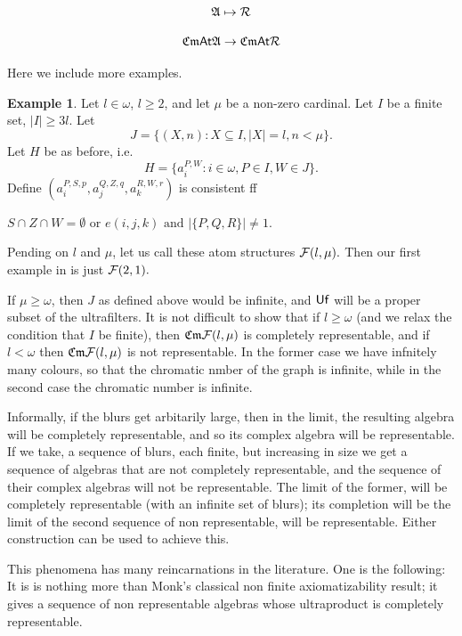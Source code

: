\documentclass[12pt]{article}
\theoremstyle{definition}
\newtheorem{example}[theorem]{Example}
\def\A{{\mathfrak{A}}}
\def\Uf{{\sf Uf}}
\def\Cm{{\mathfrak{Cm}}}
\def\A{{\mathfrak{A}}}
\def\A{{\mathfrak{A}}}
\def\At{{\sf At}}
\begin{document}
$$\A\mapsto {\cal R}$$

$$\Cm\At\A\to \Cm\At{\cal R}$$



Here we include more examples.

\begin{example}


Let $l\in \omega$, $l\geq 2$, and let $\mu$ be a non-zero cardinal. Let $I$ be a finite set,
$|I|\geq 3l.$ Let
$$J=\{(X,n): X\subseteq I, |X|=l,n<\mu\}.$$
Let $H$ be as before, i.e.
$$H=\{a_i^{P,W}: i\in \omega, P\in I, W\in J\}.$$
Define
$(a_i^{P,S,p}, a_j^{Q,Z,q}, a_k^{R,W,r})$ is consistent ff

$S\cap Z\cap W=\emptyset$ or
$ e(i,j,k) \text { and } |\{P,Q,R\}|\neq 1.$

Pending on $l$ and $\mu$, let us call these atom structures ${\cal F}(l,\mu).$
Then our first  example in is just
${\cal F}(2,1).$

If $\mu\geq \omega$, then $J$ as defined above would be infinite,
and $\Uf$ will be a proper subset of the ultrafilters.
It is not difficult to show that if $l\geq \omega$
(and we relax the condition that $I$ be finite), then
$\Cm{\cal F}(l,\mu)$ is completely representable,
and if $l<\omega$ then $\Cm{\cal F}(l,\mu)$ is not representable. In the former case we have infnitely many colours, so that the chromatic nmber
of the graph is infinite, while in the second case the chromatic number is infinite.

Informally, if the blurs get arbitarily large, then in the limit, the resulting algebra will be completely representable, and so its complex algebra
will be representable. If we take, a sequence of blurs, each finite, but increasing in size we get a sequence of algebras
that are not completely representable, and the sequence of their complex algebras will not be representable. The limit of the former,
will be  completely representable (with  an infinite set of blurs); its completion will be the limit of the second sequence of non representable, 
will be representable. Either construction can be used to achieve this. 

This phenomena has many reincarnations in the literature. One is the following:
It is is nothing more than Monk's classical non finite
axiomatizability result;  it gives a sequence of non representable algebras whose ultraproduct is completely representable.
\end{example}
\end{document}

